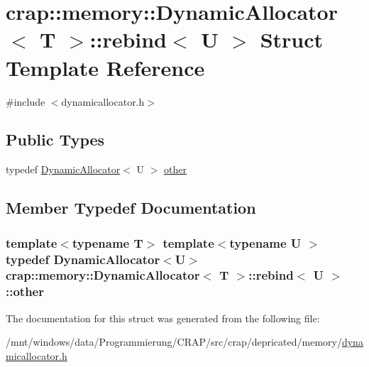 \hypertarget{structcrap_1_1memory_1_1_dynamic_allocator_1_1rebind}{\section{crap\-:\-:memory\-:\-:Dynamic\-Allocator$<$ T $>$\-:\-:rebind$<$ U $>$ Struct Template Reference}
\label{structcrap_1_1memory_1_1_dynamic_allocator_1_1rebind}
}


{\ttfamily \#include $<$dynamicallocator.\-h$>$}

\subsection*{Public Types}
\begin{DoxyCompactItemize}
\item 
typedef \hyperlink{classcrap_1_1memory_1_1_dynamic_allocator}{Dynamic\-Allocator}$<$ U $>$ \hyperlink{structcrap_1_1memory_1_1_dynamic_allocator_1_1rebind_a331e94ad51d775c44bf1283e5c5b5505}{other}
\end{DoxyCompactItemize}


\subsection{Member Typedef Documentation}
\hypertarget{structcrap_1_1memory_1_1_dynamic_allocator_1_1rebind_a331e94ad51d775c44bf1283e5c5b5505}{
\subsubsection[{other}]{\setlength{\rightskip}{0pt plus 5cm}template$<$typename T$>$ template$<$typename U $>$ typedef {\bf Dynamic\-Allocator}$<$U$>$ {\bf crap\-::memory\-::\-Dynamic\-Allocator}$<$ T $>$\-::{\bf rebind}$<$ U $>$\-::{\bf other}}}\label{structcrap_1_1memory_1_1_dynamic_allocator_1_1rebind_a331e94ad51d775c44bf1283e5c5b5505}


The documentation for this struct was generated from the following file\-:\begin{DoxyCompactItemize}
\item 
/mnt/windows/data/\-Programmierung/\-C\-R\-A\-P/src/crap/depricated/memory/\hyperlink{dynamicallocator_8h}{dynamicallocator.\-h}\end{DoxyCompactItemize}
